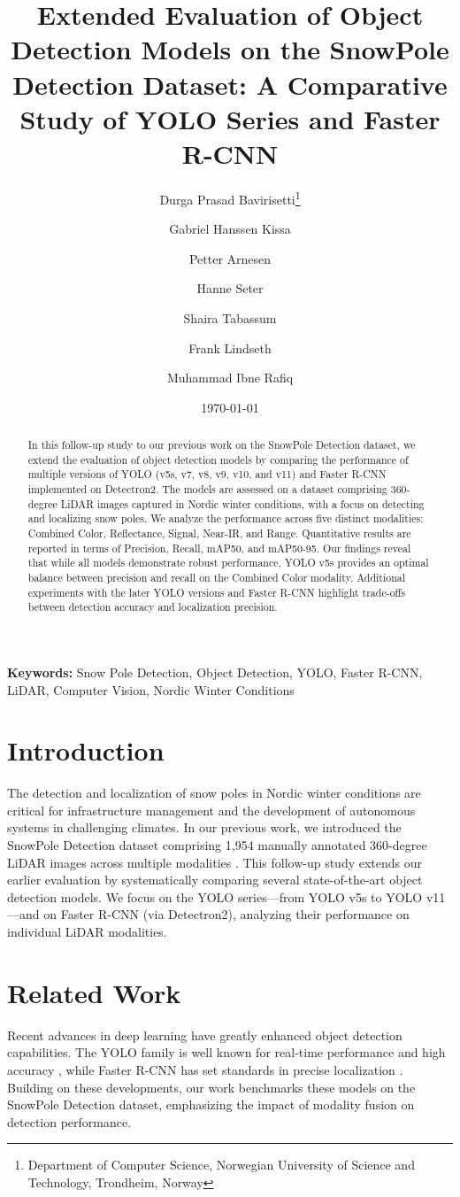 \documentclass[11pt]{article}
\title{Extended Evaluation of Object Detection Models on the SnowPole Detection Dataset: A Comparative Study of YOLO Series and Faster R-CNN}
\author{Durga Prasad Bavirisetti\thanks{Department of Computer Science, Norwegian University of Science and Technology, Trondheim, Norway} \and Gabriel Hanssen Kissa\footnotemark[1] \and Petter Arnesen\footnotemark[1] \and Hanne Seter\footnotemark[1] \and Shaira Tabassum\footnotemark[1] \and Frank Lindseth\footnotemark[1] \and Muhammad Ibne Rafiq
}
\date{\today}
\begin{document}
\maketitle

\begin{abstract}
In this follow-up study to our previous work on the SnowPole Detection dataset, we extend the evaluation of object detection models by comparing the performance of multiple versions of YOLO (v5s, v7, v8, v9, v10, and v11) and Faster R-CNN implemented on Detectron2. The models are assessed on a dataset comprising 360-degree LiDAR images captured in Nordic winter conditions, with a focus on detecting and localizing snow poles. We analyze the performance across five distinct modalities: Combined Color, Reflectance, Signal, Near-IR, and Range. Quantitative results are reported in terms of Precision, Recall, mAP50, and mAP50-95. Our findings reveal that while all models demonstrate robust performance, YOLO v5s provides an optimal balance between precision and recall on the Combined Color modality. Additional experiments with the later YOLO versions and Faster R-CNN highlight trade-offs between detection accuracy and localization precision.
\end{abstract}

\textbf{Keywords:} Snow Pole Detection, Object Detection, YOLO, Faster R-CNN, LiDAR, Computer Vision, Nordic Winter Conditions

\section{Introduction}
The detection and localization of snow poles in Nordic winter conditions are critical for infrastructure management and the development of autonomous systems in challenging climates. In our previous work, we introduced the SnowPole Detection dataset comprising 1,954 manually annotated 360-degree LiDAR images across multiple modalities \cite{bavirisetti2024snowpole}. This follow-up study extends our earlier evaluation by systematically comparing several state-of-the-art object detection models. We focus on the YOLO series—from YOLO v5s to YOLO v11—and on Faster R-CNN (via Detectron2), analyzing their performance on individual LiDAR modalities.

\section{Related Work}
Recent advances in deep learning have greatly enhanced object detection capabilities. The YOLO family is well known for real-time performance and high accuracy \cite{redmon2016you, bochkovskiy2020yolov4}, while Faster R-CNN has set standards in precise localization \cite{ren2015faster}. Building on these developments, our work benchmarks these models on the SnowPole Detection dataset, emphasizing the impact of modality fusion on detection performance.
\end{document}
